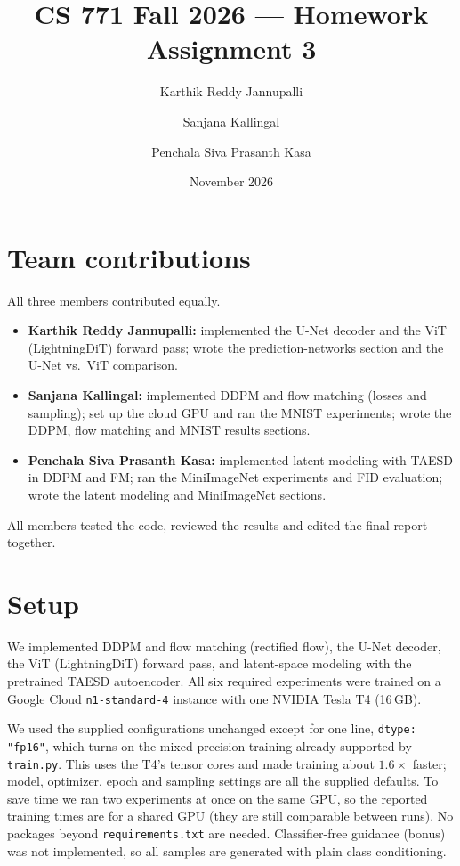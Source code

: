 \documentclass[11pt]{article}
\title{CS 771 Fall 2026 --- Homework Assignment 3}
\author{Karthik Reddy Jannupalli \and Sanjana Kallingal \and Penchala Siva Prasanth Kasa}
\date{November 2026}
\begin{document}
\maketitle

\section*{Team contributions}
All three members contributed equally.
\begin{itemize}
\item \textbf{Karthik Reddy Jannupalli:} implemented the U-Net decoder and the ViT (LightningDiT)
forward pass; wrote the prediction-networks section and the U-Net vs.\ ViT comparison.
\item \textbf{Sanjana Kallingal:} implemented DDPM and flow matching (losses and sampling); set up the
cloud GPU and ran the MNIST experiments; wrote the DDPM, flow matching and MNIST results sections.
\item \textbf{Penchala Siva Prasanth Kasa:} implemented latent modeling with TAESD in DDPM and FM;
ran the MiniImageNet experiments and FID evaluation; wrote the latent modeling and MiniImageNet sections.
\end{itemize}
All members tested the code, reviewed the results and edited the final report together.

\section{Setup}
We implemented DDPM and flow matching (rectified flow), the U-Net decoder, the ViT (LightningDiT)
forward pass, and latent-space modeling with the pretrained TAESD autoencoder. All six required
experiments were trained on a Google Cloud \texttt{n1-standard-4} instance with one NVIDIA Tesla T4 (16\,GB).

We used the supplied configurations unchanged except for one line, \texttt{dtype: "fp16"}, which
turns on the mixed-precision training already supported by \texttt{train.py}. This uses the T4's
tensor cores and made training about $1.6\times$ faster; model, optimizer, epoch and sampling
settings are all the supplied defaults. To save time we ran two experiments at once on the same GPU,
so the reported training times are for a shared GPU (they are still comparable between runs).
No packages beyond \texttt{requirements.txt} are needed. Classifier-free guidance (bonus) was not
implemented, so all samples are generated with plain class conditioning.
\end{document}

